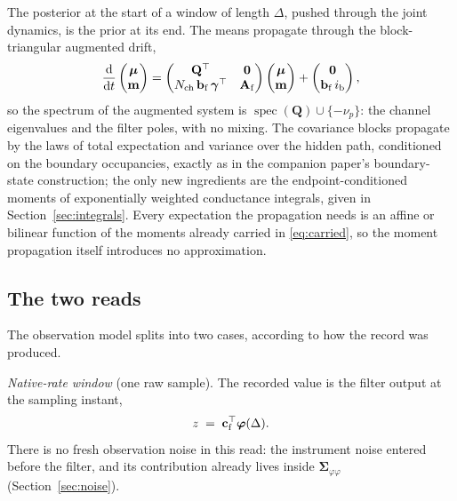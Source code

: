\documentclass[11pt]{article}
\begin{document}
The posterior at the start of a window of length $\Delta$, pushed through
the joint dynamics, is the prior at its end. The means propagate through
the block-triangular augmented drift,
\begin{equation}
  \frac{\mathrm{d}}{\mathrm{d}t}
  \begin{pmatrix} \bm{\mu} \\ \mathbf{m} \end{pmatrix}
  =
  \begin{pmatrix}
    \mathbf{Q}^{\top} & \mathbf{0} \\
    N_{\mathrm{ch}}\,\mathbf{b}_{\mathrm{f}}\,\bm{\gamma}^{\top} & \mathbf{A}_{\mathrm{f}}
  \end{pmatrix}
  \begin{pmatrix} \bm{\mu} \\ \mathbf{m} \end{pmatrix}
  +
  \begin{pmatrix} \mathbf{0} \\ \mathbf{b}_{\mathrm{f}}\, i_{\mathrm{b}} \end{pmatrix},
  \label{eq:mean-prop}
\end{equation}
so the spectrum of the augmented system is
$\operatorname{spec}(\mathbf{Q}) \cup \{-\nu_p\}$: the channel eigenvalues
and the filter poles, with no mixing. The covariance blocks propagate by
the laws of total expectation and variance over the hidden path,
conditioned on the boundary occupancies, exactly as in the companion
paper's boundary-state construction; the only new ingredients are the
endpoint-conditioned moments of exponentially weighted conductance
integrals, given in Section~\ref{sec:integrals}. Every expectation the
propagation needs is an affine or bilinear function of the moments already
carried in \eqref{eq:carried}, so the moment propagation itself introduces
no approximation.

\subsection{The two reads}

The observation model splits into two cases, according to how the record
was produced.

\emph{Native-rate window} (one raw sample). The recorded value is the
filter output at the sampling instant,
\begin{equation}
  z \;=\; \mathbf{c}_{\mathrm{f}}^{\top}\bm{\varphi}(\Delta).
  \label{eq:read-native}
\end{equation}
There is no fresh observation noise in this read: the instrument noise
entered before the filter, and its contribution already lives inside
$\bm{\Sigma}_{\!\varphi\varphi}$ (Section~\ref{sec:noise}).
\end{document}
